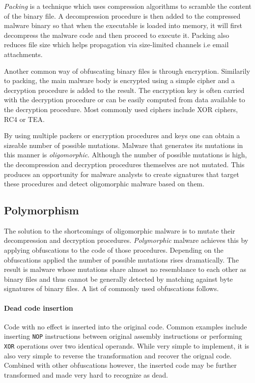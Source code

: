 \emph{Packing} is a technique which uses compression algorithms to scramble the content of the binary file\cite{Symatec08}. A decompression procedure is then added to the compressed malware binary so that when the executable is loaded into memory, it will first decompress the malware code and then proceed to execute it. Packing also reduces file size which helps propagation via size-limited channels i.e email attachments. 

Another common way of obfuscating binary files is through encryption. Similarily to packing, the main malware body is encrypted using a simple cipher and a decryption procedure is added to the result. The encryption key is often carried with the decryption procedure or can be easily computed from data available to the decryption procedure. Most commonly used ciphers include XOR ciphers, RC4 or TEA. 

By using multiple packers or encryption procedures and keys one can obtain a sizeable number of possible mutations. Malware that generates its mutations in this manner is \emph{oligomorphic}. Although the number of possible mutations is high, the decompression and decryption procedures themselves are not mutated. This produces an opportunity for malware analysts to create signatures that target these procedures and detect oligomorphic malware based on them.

\subsection{Polymorphism}
The solution to the shortcomings of oligomorphic malware is to mutate their decompression and decryption procedures. \emph{Polymorphic} malware achieves this by applying obfuscations to the code of those procedures. Depending on the obfuscations applied the number of possible mutations rises dramatically. The result is malware whose mutations share almost no resemblance to each other as binary files and thus cannot be generally detected by matching against byte signatures of binary files. A list of commonly used obfuscations follows.

\paragraph*{Dead code insertion}
Code with no effect is inserted into the original code. Common examples include inserting \texttt{NOP} instructions between original assembly instructions or performing \texttt{XOR} operations over two identical operands. While very simple to implement, it is also very simple to reverse the transformation and recover the orignal code. Combined with other obfuscations however, the inserted code may be further transformed and made very hard to recognize as dead.

